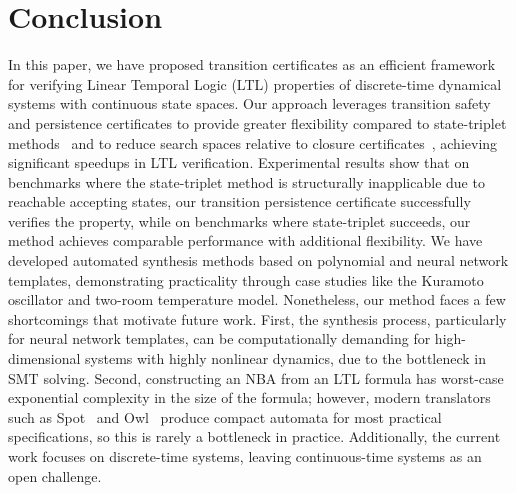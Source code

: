 \section{Conclusion}
\label{sec:conclusion}

In this paper, we have proposed transition certificates as an efficient framework for verifying Linear Temporal Logic (LTL) properties of discrete-time dynamical systems with continuous state spaces. Our approach leverages transition safety and persistence certificates to provide greater flexibility compared to state-triplet methods~\cite{wongpiromsarn2015automata} and to reduce search spaces relative to closure certificates~\cite{murali2024closure}, achieving significant speedups in LTL verification. Experimental results show that on benchmarks where the state-triplet method is structurally inapplicable due to reachable accepting states, our transition persistence certificate successfully verifies the property, while on benchmarks where state-triplet succeeds, our method achieves comparable performance with additional flexibility. We have developed automated synthesis methods based on polynomial and neural network templates, demonstrating practicality through case studies like the Kuramoto oscillator and two-room temperature model. Nonetheless, our method faces a few shortcomings that motivate future work. First, the synthesis process, particularly for neural network templates, can be computationally demanding for high-dimensional systems with highly nonlinear dynamics, due to the bottleneck in SMT solving. Second, constructing an NBA from an LTL formula has worst-case exponential complexity in the size of the formula; however, modern translators such as Spot~\cite{spot} and Owl~\cite{owl} produce compact automata for most practical specifications, so this is rarely a bottleneck in practice. Additionally, the current work focuses on discrete-time systems, leaving continuous-time systems as an open challenge.